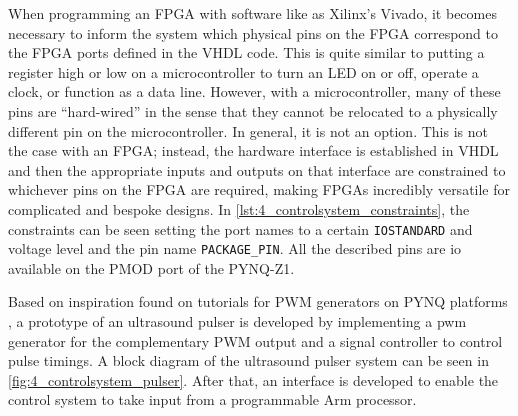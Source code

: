 When programming an FPGA with software like as Xilinx's Vivado, it becomes necessary to inform the system which physical pins on the FPGA correspond to the FPGA ports defined in the VHDL code. This is quite similar to putting a register high or low on a microcontroller to turn an LED on or off, operate a clock, or function as a data line. However, with a microcontroller, many of these pins are \enquote{hard-wired} in the sense that they cannot be relocated to a physically different pin on the microcontroller. In general, it is not an option. This is not the case with an FPGA; instead, the hardware interface is established in VHDL and then the appropriate inputs and outputs on that interface are constrained to whichever pins on the FPGA are required, making FPGAs incredibly versatile for complicated and bespoke designs. In \cref{lst:4_controlsystem_constraints}, the constraints can be seen setting the port names to a certain \texttt{IOSTANDARD} and voltage level and the pin name \texttt{PACKAGE\_PIN}. All the described pins are \gls{io} available on the PMOD port of the PYNQ-Z1.

Based on inspiration found on tutorials for PWM generators on PYNQ platforms \cite{jan_cumps,vhdl_pwm_gen}, a prototype of an ultrasound pulser is developed by implementing a \gls{pwm} generator for the complementary PWM output and a signal controller to control pulse timings. A block diagram of the ultrasound pulser system can be seen in \cref{fig:4_controlsystem_pulser}. After that, an interface is developed to enable the control system to take input from a programmable Arm processor.

